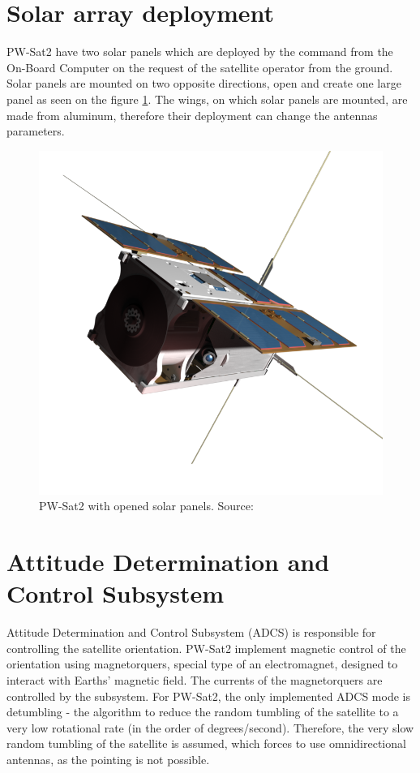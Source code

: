 \section{Solar array deployment}
PW-Sat2 have two solar panels which are deployed by the command from the On-Board Computer on the request of the satellite operator from the ground. Solar panels are mounted on two opposite directions, open and create one large panel as seen on the figure \ref{PW-Sat_solar_panels}. The wings, on which solar panels are mounted, are made from aluminum, therefore their deployment can change the antennas parameters.
\begin{figure}
    \centering
    \includegraphics[width=0.38\paperwidth]{img/2/pwsat_solar_panels.png}
    \caption{PW-Sat2 with opened solar panels. Source: \cite{PW_sat2_photo}}
    \label{PW-Sat_solar_panels}
\end{figure}

\section{Attitude Determination and Control Subsystem}
Attitude Determination and Control Subsystem (ADCS) is responsible for controlling the satellite orientation. PW-Sat2 implement magnetic control of the orientation using magnetorquers, special type of an electromagnet, designed to interact with Earths' magnetic field. The currents of the magnetorquers are controlled by the subsystem. For PW-Sat2, the only implemented ADCS mode is detumbling - the algorithm to reduce the random tumbling of the satellite to a very low rotational rate (in the order of degrees/second). Therefore, the very slow random tumbling of the satellite is assumed, which forces to use omnidirectional antennas, as the pointing is not possible.

